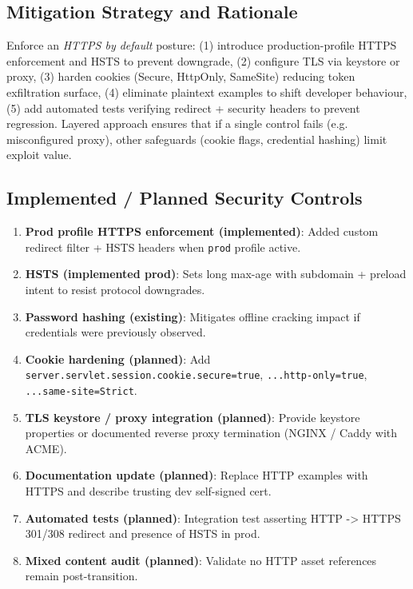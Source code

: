 \documentclass[]{UCD_CS_FYP_Report}
\begin{document}
\subsection*{Mitigation Strategy and Rationale}
Enforce an \textit{HTTPS by default} posture: (1) introduce production-profile HTTPS enforcement and HSTS to prevent downgrade, (2) configure TLS via keystore or proxy, (3) harden cookies (Secure, HttpOnly, SameSite) reducing token exfiltration surface, (4) eliminate plaintext examples to shift developer behaviour, (5) add automated tests verifying redirect + security headers to prevent regression. Layered approach ensures that if a single control fails (e.g. misconfigured proxy), other safeguards (cookie flags, credential hashing) limit exploit value.

\subsection*{Implemented / Planned Security Controls}
\begin{enumerate}
	\item \textbf{Prod profile HTTPS enforcement (implemented)}: Added custom redirect filter + HSTS headers when \texttt{prod} profile active.
	\item \textbf{HSTS (implemented prod)}: Sets long max-age with subdomain + preload intent to resist protocol downgrades.
	\item \textbf{Password hashing (existing)}: Mitigates offline cracking impact if credentials were previously observed.
	\item \textbf{Cookie hardening (planned)}: Add \texttt{server.servlet.session.cookie.secure=true}, \texttt{...http-only=true}, \texttt{...same-site=Strict}.
	\item \textbf{TLS keystore / proxy integration (planned)}: Provide keystore properties or documented reverse proxy termination (NGINX / Caddy with ACME).
	\item \textbf{Documentation update (planned)}: Replace HTTP examples with HTTPS and describe trusting dev self-signed cert.
	\item \textbf{Automated tests (planned)}: Integration test asserting HTTP -> HTTPS 301/308 redirect and presence of HSTS in prod.
	\item \textbf{Mixed content audit (planned)}: Validate no HTTP asset references remain post-transition.
\end{enumerate}
\end{document}
